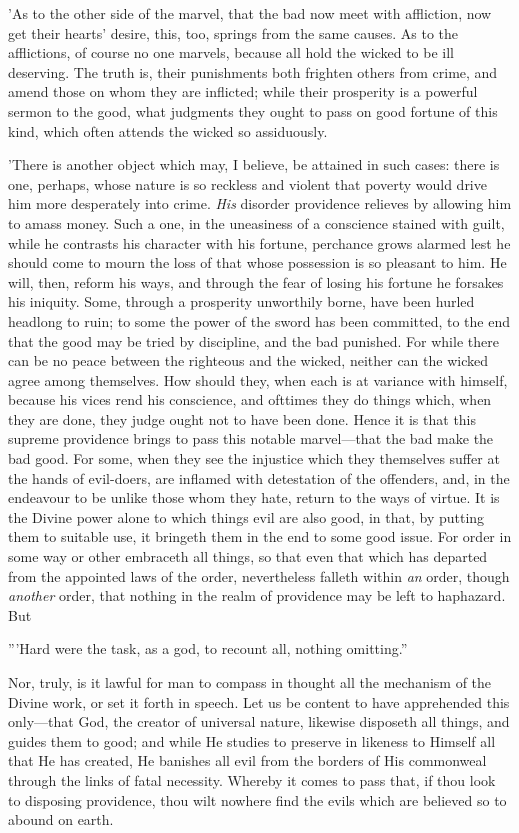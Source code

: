 'As to the other side of the marvel, that the bad now meet with
affliction, now get their hearts' desire, this, too, springs from the
same causes. As to the afflictions, of course no one marvels, because
all hold the wicked to be ill deserving. The truth is, their punishments
both frighten others from crime, and amend those on whom they are
inflicted; while their prosperity is a powerful sermon to the good, what
judgments they ought to pass on good fortune of this kind, which often
attends the wicked so assiduously.

'There is another object which may, I believe, be attained in such
cases: there is one, perhaps, whose nature is so reckless and violent
that poverty would drive him more desperately into crime. \emph{His} disorder
providence relieves by allowing him to amass money. Such a one, in the
uneasiness of a conscience stained with guilt, while he contrasts his
character with his fortune, perchance grows alarmed lest he should come
to mourn the loss of that whose possession is so pleasant to him. He
will, then, reform his ways, and through the fear of losing his fortune
he forsakes his iniquity. Some, through a prosperity unworthily borne,
have been hurled headlong to ruin; to some the power of the sword has
been committed, to the end that the good may be tried by discipline, and
the bad punished. For while there can be no peace between the righteous
and the wicked, neither can the wicked agree among themselves. How
should they, when each is at variance with himself, because his vices
rend his conscience, and ofttimes they do things which, when they are
done, they judge ought not to have been done. Hence it is that this
supreme providence brings to pass this notable marvel—that the bad make
the bad good. For some, when they see the injustice which they
themselves suffer at the hands of evil-doers, are inflamed with
detestation of the offenders, and, in the endeavour to be unlike those
whom they hate, return to the ways of virtue. It is the Divine power
alone to which things evil are also good, in that, by putting them to
suitable use, it bringeth them in the end to some good issue. For order
in some way or other embraceth all things, so that even that which has
departed from the appointed laws of the order, nevertheless falleth
within \emph{an} order, though \emph{another} order, that nothing in the realm of
providence may be left to haphazard. But

'''Hard were the task, as a god, to recount all, nothing omitting.''

Nor, truly, is it lawful for man to compass in thought all the mechanism
of the Divine work, or set it forth in speech. Let us be content to
have apprehended this only—that God, the creator of universal nature,
likewise disposeth all things, and guides them to good; and while He
studies to preserve in likeness to Himself all that He has created, He
banishes all evil from the borders of His commonweal through the links
of fatal necessity. Whereby it comes to pass that, if thou look to
disposing providence, thou wilt nowhere find the evils which are
believed so to abound on earth.

